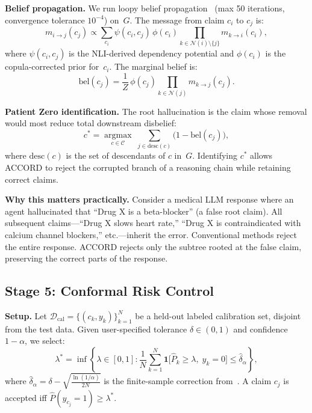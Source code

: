 \documentclass[conference]{IEEEtran}
\begin{document}
\textbf{Belief propagation.}
We run loopy belief propagation~\cite{pearl1988}
(max 50 iterations, convergence tolerance $10^{-4}$) on~$G$.
The message from claim $c_i$ to $c_j$ is:
\begin{equation}
  m_{i \to j}(c_j) \propto
  \sum_{c_i} \psi(c_i, c_j)\,\phi(c_i)
  \prod_{k \in \mathcal{N}(i) \setminus \{j\}} m_{k \to i}(c_i),
  \label{eq:message}
\end{equation}
where $\psi(c_i, c_j)$ is the NLI-derived dependency potential
and $\phi(c_i)$ is the copula-corrected prior for~$c_i$.
The marginal belief is:
\begin{equation}
  \mathrm{bel}(c_j) =
  \frac{1}{Z}\,\phi(c_j)
  \prod_{k \in \mathcal{N}(j)} m_{k \to j}(c_j).
  \label{eq:belief}
\end{equation}

\textbf{Patient Zero identification.}
The root hallucination is the claim whose removal would most
reduce total downstream disbelief:
\begin{equation}
  c^* = \operatorname*{argmax}_{c \in \mathcal{C}}\;
         \sum_{j \in \mathrm{desc}(c)}
         \bigl(1 - \mathrm{bel}(c_j)\bigr),
  \label{eq:patientzero}
\end{equation}
where $\mathrm{desc}(c)$ is the set of descendants of $c$ in~$G$.
Identifying $c^*$ allows ACCORD to reject the corrupted branch
of a reasoning chain while retaining correct claims.

\textbf{Why this matters practically.}
Consider a medical LLM response where an agent hallucinated
that ``Drug X is a beta-blocker'' (a false root claim).
All subsequent claims—``Drug X slows heart rate,''
``Drug X is contraindicated with calcium channel blockers,''
etc.—inherit the error.
Conventional methods reject the entire response.
ACCORD rejects only the subtree rooted at the false claim,
preserving the correct parts of the response.

\subsection{Stage 5: Conformal Risk Control}
\label{sec:crc}

\textbf{Setup.}
Let $\mathcal{D}_\text{cal} = \{(c_k, y_k)\}_{k=1}^N$ be a
held-out labeled calibration set, disjoint from the test data.
Given user-specified tolerance $\delta \in (0, 1)$ and
confidence $1 - \alpha$, we select:
\begin{equation}
  \lambda^* = \inf\!\left\{
    \lambda \in [0,1] :
    \frac{1}{N} \sum_{k=1}^N
    \mathbf{1}\!\bigl[\hat{P}_k \geq \lambda,\; y_k = 0\bigr]
    \leq \hat{\delta}_\alpha
  \right\},
  \label{eq:crc}
\end{equation}
where $\hat{\delta}_\alpha = \delta - \sqrt{\frac{\ln(1/\alpha)}{2N}}$
is the finite-sample correction from~\citet{angelopoulos2022crc}.
A claim $c_j$ is accepted iff $\hat{P}(y_{c_j} = 1) \geq \lambda^*$.
\end{document}

